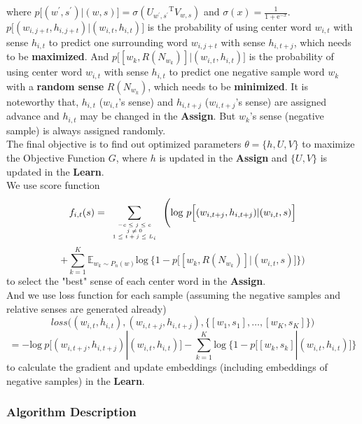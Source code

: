 \documentclass[12pt,a4paper,twoside]{book}
\begin{document}
where $p\Big[(w^\prime,s^\prime)|(w,s)\Big] = \sigma({U_{w^\prime,s^\prime}}^{\mathrm{T}}V_{w,s})$
 and $\sigma(x) = \frac{1}{1+\mathrm{e}^{-x}}$. \\
 
 $p\Big [(w_{i,j+t},h_{i,j+t})|(w_{i,t},h_{i,t})\Big ]$ is the probability of using center word $w_{i,t}$ with sense $h_{i,t}$ to predict one surrounding word $w_{i,j+t}$ with sense $h_{i,t+j}$, which needs to be \textbf{maximized}.
And $p\Big[[w_k,R(N_{w_k})]|(w_{i,t},h_{i,t})\Big ]$ is the probability of using center word $w_{i,t}$ with sense $h_{i,t}$ to predict one negative sample word $w_k$ with a \textbf{random sense} $R(N_{w_k})$, which needs to be \textbf{minimized}. 
It is noteworthy that, $h_{i,t}$  ($w_{i,t}$'s sense) and $h_{i,t+j}$ ($w_{i,t+j}$'s sense) are assigned advance and $h_{i,t}$ may be changed in the \textbf{Assign}. But $w_k$'s sense (negative sample) is always assigned randomly. \\

The final objective is to find out optimized parameters $\theta = \{h,U,V\}$ to maximize the Objective Function $G$, where $h$ is updated in the \textbf{Assign} and $\{U,V\}$ is updated in the \textbf{Learn}.\\

We use score function 
$$f_{i,t}(s) = \sum\limits_{\mbox{\tiny$\begin{array}{c}-c\leq j \leq c\\ j\neq 0\\ 1\leq t+j\leq L_i\end{array}$}}\Bigg (\mathrm{log}\ p\Big [(w_{i,t+j},h_{i,t+j})|(w_{i,t},s)\Big ]$$
$$+\sum\limits_{k=1}^K\mathbb{E}_{w_k\sim P_n(w)}\mathrm{log}\ \Big \{1-p\Big[[w_k,R(N_{w_k})]|(w_{i,t},s)\Big ] \Big \} \Bigg )$$
to select the "best" sense of each center word in the \textbf{Assign}.\\

And we use loss function for each sample (assuming the negative samples and relative senses are generated already)
$$loss\bigg ( (w_{i,t},h_{i,t}),(w_{i,t+j},h_{i,t+j}),\big \{[w_1,s_1],\ldots,[w_K,s_K]\big \}\bigg )$$
$$ = -\mathrm{log}\ p\Big [(w_{i,t+j},h_{i,t+j})|(w_{i,t},h_{i,t})\Big ]-\sum\limits_{k=1}^K\mathrm{log}\ \Big \{1-p\Big[[w_k,s_k]|(w_{i,t},h_{i,t})\Big ] \Big \}$$
to calculate the gradient and update embeddings (including embeddings of negative samples) in the \textbf{Learn}.

\subsubsection{Algorithm Description}
\end{document}
